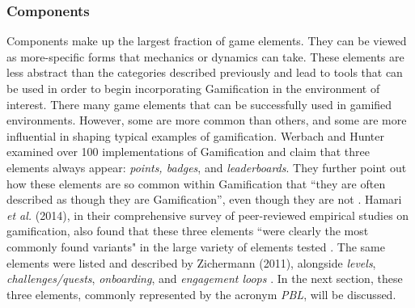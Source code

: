 \subsubsection{Components}
Components make up the largest fraction of game elements. They can be viewed as more-specific forms that mechanics or dynamics can take. These elements are less abstract than the categories described previously and lead to tools that can be used in order to begin incorporating Gamification in the environment of interest. There many game elements that can be successfully used in gamified environments. However, some are more common than others, and some are more influential in shaping typical examples of gamification. Werbach and Hunter examined over 100 implementations of Gamification and claim that three elements always appear: \textit{points, badges}, and \textit{leaderboards}. They further point out how these elements are so common within Gamification that ``they are often described as though they are Gamification'', even though they are not \cite{werbach2012win}.  Hamari \textit{et al.} (2014), in their comprehensive survey of peer-reviewed empirical studies on gamification, also found that these three elements ``were clearly the most commonly found variants" in the large variety of elements tested \cite{hamari2014does}. The same elements were listed and described by Zichermann (2011), alongside \textit{levels}, \textit{challenges/quests}, \textit{onboarding}, and \textit{engagement loops} \cite{zichermann2011gamification}. In the next section, these three elements, commonly represented by the acronym \textit{PBL}, will be discussed.
